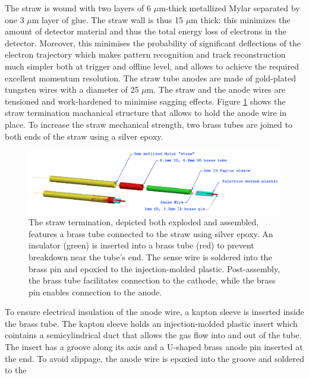 The straw is wound with two layers of 6 $\mu$m-thick metallized 
Mylar separated by one 3 $\mu$m layer of glue. The straw wall is thus 15 $\mu$m thick: 
this minimizes the amount of detector material and thus the total energy 
loss of electrons in the detector. Moreover, this minimises the probability 
of significant deflections of the electron trajectory which makes pattern 
recognition and track reconstruction much simpler both at trigger 
and offline level, and allows to achieve the required excellent momentum 
resolution. The straw tube anodes are made of gold-plated tungsten wires with 
a diameter of 25 $\mu$m. The straw and the anode wires are tensioned 
and work-hardened to minimise sagging effects.
Figure \ref{fig:trktubessmon} shows the straw termination machanical 
structure that allows to hold the anode wire in place.
To increase the straw mechanical strength, two brass tubes 
are joined to both ends of the straw using a silver epoxy.
    \begin{figure}[!h]
        \centering
        \includegraphics[width =\textwidth]{figures/png/Screenshot_20240706_153158.png}
        \caption[The straw termination.]{The straw termination, depicted both exploded and assembled, 
        features a brass tube connected to the straw using silver epoxy. 
        An insulator (green) is inserted into a brass tube 
        (red) to prevent breakdown near the tube's end. The sense 
        wire is soldered into the brass pin and epoxied to the 
        injection-molded plastic. Post-assembly, the brass tube 
        facilitates connection to the cathode, while the brass pin 
        enables connection to the anode.}
        \label{fig:trktubessmon}
        \end{figure}
        To ensure electrical insulation of the anode wire, 
        a kapton sleeve is inserted inside the brass tube. 
        The kapton sleeve holds an injection-molded plastic 
        insert which cointains a semicylindrical duct that 
        allows the gas flow into and out of the tube. The insert 
        has a groove along its axis and a U-shaped brass anode 
        pin inserted at the end. To avoid slippage, the anode 
        wire is epoxied into the groove and soldered to the 
